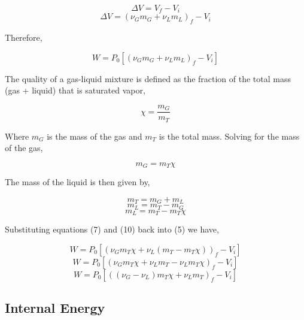 \documentclass[10pt,parskip=half,
toc=sectionentrywithdots,
bibliography=totocnumbered,
captions=tableheading,numbers=noendperiod]{scrartcl}
\begin{document}
\begin{equation}\Delta V =  V_f - V_i\end{equation}
\begin{equation}\Delta V =  \left(\nu_Gm_G + \nu_Lm_L \right)_f - V_i\end{equation}

Therefore,

\begin{equation}W = P_0\left[\left(\nu_Gm_G + \nu_Lm_L \right)_f - V_i\right]\end{equation}

The quality of a gas-liquid mixture is defined as the fraction of the
total mass (gas + liquid) that is saturated vapor,

\begin{equation}\chi = \frac{m_G}{m_T}\end{equation}

Where \(m_G\) is the mass of the gas and \(m_T\) is the total mass.
Solving for the mass of the gas,

\begin{equation}m_G = m_T \chi\end{equation}

The mass of the liquid is then given by,

\begin{equation}m_T = m_G + m_L\end{equation}
\begin{equation}m_L = m_T - m_G\end{equation}
\begin{equation}m_L = m_T - m_T \chi\end{equation}

Substituting equations (7) and (10) back into (5) we have,

\begin{equation}W = P_0\left[\left( \nu_G m_T \chi + \nu_L(m_T - m_T \chi) \right)_f - V_i\right]\end{equation}
\begin{equation}W = P_0\left[\left( \nu_G m_T \chi + \nu_L m_T - \nu_L m_T \chi \right)_f - V_i\right]\end{equation}
\begin{equation}W = P_0\left[\left( \left(\nu_G - \nu_L \right) m_T \chi + \nu_L m_T \right)_f - V_i\right]\end{equation}

\hypertarget{internal-energy}{%
\subsection{Internal Energy}\label{internal-energy}}
\end{document}
